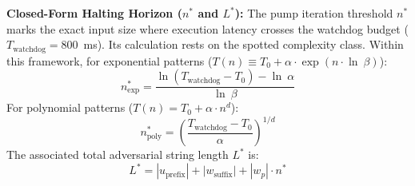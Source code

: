 \documentclass{ieeeaccess}
\begin{document}
\textbf{Closed-Form Halting Horizon ($n^*$ and $L^*$):} The pump iteration threshold $n^*$ marks the exact input size where execution latency crosses the watchdog budget ($T_{\mathrm{watchdog}} = 800$~ms). Its calculation rests on the spotted complexity class. Within this framework, for exponential patterns ($T(n) \equiv T_0 + \alpha \cdot \exp(n \cdot \ln\ \beta)$):
\begin{equation}\label{eq:n_star_exp}
n^*_{\mathrm{exp}} = \frac{\ln(T_{\mathrm{watchdog}} - T_0) - \ln\ \alpha}{\ln\ \beta}
\end{equation}
For polynomial patterns ($T(n) = T_0 + \alpha \cdot n^d$):
\begin{equation}\label{eq:n_star_poly}
n^*_{\mathrm{poly}} = \left( \frac{T_{\mathrm{watchdog}} - T_0}{\alpha} \right)^{1/d}
\end{equation}
The associated total adversarial string length $L^*$ is:
\begin{equation}\label{eq:L_star}
L^* = |u_{\mathrm{prefix}}| + |w_{\mathrm{suffix}}| + |w_p| \cdot n^*
\end{equation}
\end{document}
